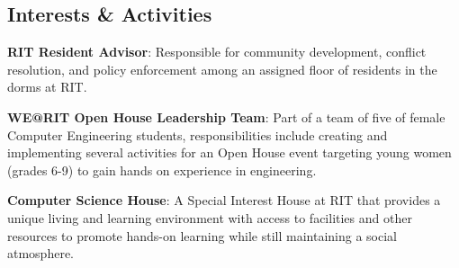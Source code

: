 \documentclass[a4paper,margin,line]{resume}
\begin{document}
\begin{resume}
\section{\mysidestyle Interests \& Activities}
    \begin{asparablank}
        \item \textbf{RIT Resident Advisor}: Responsible for community development, conflict resolution, and policy enforcement among an assigned floor of residents in the dorms at RIT.\\
        \item \textbf{WE@RIT Open House Leadership Team}: Part of a team of five of female Computer Engineering students, 
        responsibilities include creating and implementing several activities for an Open House event targeting young women (grades 6-9) 
        to gain hands on experience in engineering.\\
        \item \textbf{Computer Science House}: A Special Interest House at RIT that
            provides a unique living and learning environment with access to facilities and other resources to promote hands-on learning while still maintaining a social atmosphere.\\
    \end{asparablank}
\end{resume}
\end{document}
